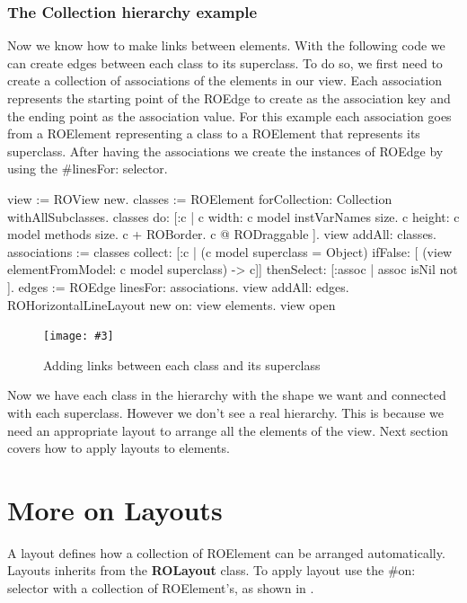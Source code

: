 \documentclass[a4paper,10pt,twoside]{book}
\newcommand{\fig}[4]{
		\begin{figure}[#1]
			\centering
			\texttt{[image: \#3]}
			\caption{\label{fig:#3}#4}
		\end{figure}}
\begin{document}
\subsubsection*{The Collection hierarchy example}
Now we know how to make links between elements. With the following code we can create edges between each class to its superclass. To do so, we first need to create a collection of associations of the elements in our view. Each association represents the starting point of the ROEdge to create as the association key and the ending point as the association value. For this example each association goes from a ROElement representing a class to a ROElement that represents its superclass. After having the associations we create the instances of ROEdge by using the \#linesFor: selector.

\begin{code}{}
view := ROView new.
classes := ROElement forCollection: Collection withAllSubclasses.
classes do: [:c | 
	c width: c model instVarNames size.
	c height: c model methods size.
	c + ROBorder. 
	c @ RODraggable ].
view addAll: classes.
associations := classes 
					collect: [:c | 	(c model superclass = Object)
										ifFalse: [ (view elementFromModel: c model superclass) -> c]]
					thenSelect: [:assoc | assoc isNil not ].
edges := ROEdge linesFor: associations.
view addAll: edges.
ROHorizontalLineLayout new on: view elements.
view open
\end{code}

\fig{H}{0.6}{hier3}{Adding links between each class and its superclass}

Now we have each class in the  hierarchy with the shape we want and connected with each superclass. However we don't see a real hierarchy. This is because we need an appropriate layout to arrange all the elements of the view. Next section covers how to apply layouts to elements.


\section{More on Layouts} 
A layout defines how a collection of ROElement can be arranged automatically. Layouts inherits from the \textbf{ROLayout} class. To apply  layout use the \#on: selector with a collection of ROElement's, as shown in .
\end{document}
